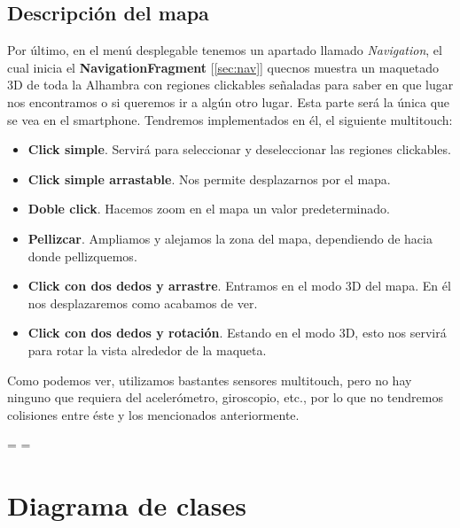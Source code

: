 \documentclass[11pt,a4paper]{article}
\begin{document}
\subsection{Descripción del mapa}
\label{sec:mapa}

Por último, en el menú desplegable tenemos un apartado llamado \textit{Navigation}, el cual inicia el \textbf{NavigationFragment} [\ref{sec:nav}]
quecnos muestra un maquetado 3D de toda la Alhambra con regiones clickables señaladas para saber en que lugar nos encontramos o si queremos
ir a algún otro lugar. Esta parte será la única que se vea en el smartphone. Tendremos implementados en él, el siguiente multitouch:

\begin{itemize}
    \item \textbf{Click simple}. Servirá para seleccionar y deseleccionar las regiones clickables.
    \item \textbf{Click simple arrastable}. Nos permite desplazarnos por el mapa.
    \item \textbf{Doble click}. Hacemos zoom en el mapa un valor predeterminado.
    \item \textbf{Pellizcar}. Ampliamos y alejamos la zona del mapa, dependiendo de hacia donde pellizquemos.
    \item \textbf{Click con dos dedos y arrastre}. Entramos en el modo 3D del mapa. En él nos desplazaremos como acabamos de ver.
    \item \textbf{Click con dos dedos y rotación}. Estando en el modo 3D, esto nos servirá para rotar la vista alrededor de la maqueta.
\end{itemize}

Como podemos ver, utilizamos bastantes sensores multitouch, pero no hay ninguno que requiera del acelerómetro, giroscopio, etc., por lo
que no tendremos colisiones entre éste y los mencionados anteriormente.



%

\recalctypearea
\pdfpageheight=\paperheight
\pdfpagewidth=\paperwidth
\pagestyle{lscape}

\newpage

\section{Diagrama de clases}
\end{document}
